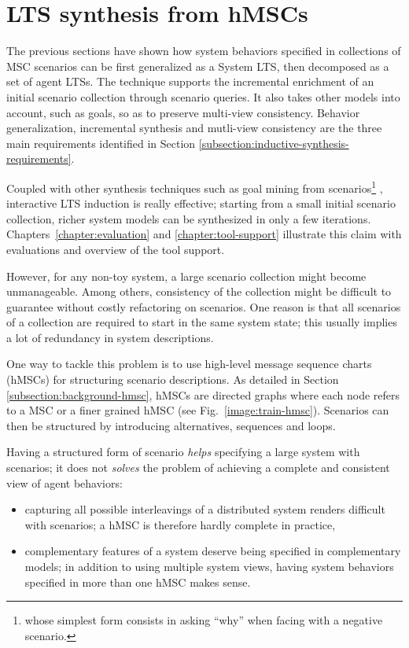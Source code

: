 \section{LTS synthesis from hMSCs\label{section:inductive-from-hMSC}}

The previous sections have shown how system behaviors specified in collections of MSC scenarios can be first generalized as a System LTS, then decomposed as a set of agent LTSs. The technique supports the incremental enrichment of an initial scenario collection through scenario queries. It also takes other models into account, such as goals, so as to preserve multi-view consistency. Behavior generalization, incremental synthesis and mutli-view consistency are the three main requirements identified in Section \ref{subsection:inductive-synthesis-requirements}. 

Coupled with other synthesis techniques such as goal mining from scenarios\footnote{whose simplest form consists in asking ``why'' when facing with a negative scenario.} \cite{Damas:2006}, interactive LTS induction is really effective; starting from a small initial scenario collection, richer system models can be synthesized in only a few iterations. Chapters~\ref{chapter:evaluation} and \ref{chapter:tool-support} illustrate this claim with evaluations and overview of the tool support.

However, for any non-toy system, a large scenario collection might become unmanageable. Among others, consistency of the collection might be difficult to guarantee without costly refactoring on scenarios. One reason is that all scenarios of a collection are required to start in the same system state; this usually implies a lot of redundancy in system descriptions.

One way to tackle this problem is to use high-level message sequence charts (hMSCs) for structuring scenario descriptions. As detailed in Section \ref{subsection:background-hmsc}, hMSCs are directed graphs where each node refers to a MSC or a finer grained hMSC (see Fig.~\ref{image:train-hmsc}). Scenarios can then be structured by introducing alternatives, sequences and loops.

Having a structured form of scenario \emph{helps} specifying a large system with scenarios; it does not \emph{solves} the problem of achieving a complete and consistent view of agent behaviors:
\begin{itemize}
\item capturing all possible interleavings of a distributed system renders difficult with scenarios; a hMSC is therefore hardly complete in practice,
\item complementary features of a system deserve being specified in complementary models; in addition to using multiple system views, having system behaviors specified in more than one hMSC makes sense.
\end{itemize}

